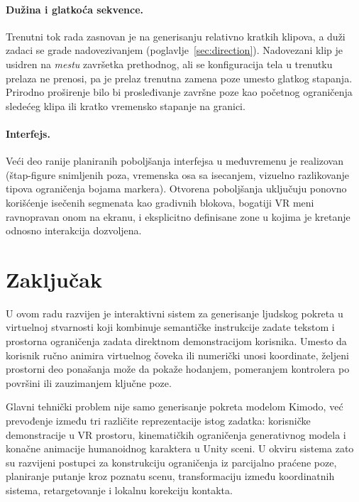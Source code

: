 \documentclass{article}
\begin{document}
\paragraph{Dužina i glatkoća sekvence.}
Trenutni tok rada zasnovan je na generisanju relativno kratkih klipova, a duži zadaci se grade nadovezivanjem (poglavlje~\ref{sec:direction}). Nadovezani klip je usidren na \emph{mestu} završetka prethodnog, ali se konfiguracija tela u trenutku prelaza ne prenosi, pa je prelaz trenutna zamena poze umesto glatkog stapanja. Prirodno proširenje bilo bi prosleđivanje završne poze kao početnog ograničenja sledećeg klipa ili kratko vremensko stapanje na granici.

\paragraph{Interfejs.}
Veći deo ranije planiranih poboljšanja interfejsa u međuvremenu je realizovan (štap-figure snimljenih poza, vremenska osa sa isecanjem, vizuelno razlikovanje tipova ograničenja bojama markera). Otvorena poboljšanja uključuju ponovno korišćenje isečenih segmenata kao gradivnih blokova, bogatiji VR meni ravnopravan onom na ekranu, i eksplicitno definisane zone u kojima je kretanje odnosno interakcija dozvoljena.


\section{Zaključak}
\label{sec:conclusion}

U ovom radu razvijen je interaktivni sistem za generisanje ljudskog pokreta u virtuelnoj stvarnosti koji kombinuje semantičke instrukcije zadate tekstom i prostorna ograničenja zadata direktnom demonstracijom korisnika. Umesto da korisnik ručno animira virtuelnog čoveka ili numerički unosi koordinate, željeni prostorni deo ponašanja može da pokaže hodanjem, pomeranjem kontrolera po površini ili zauzimanjem ključne poze.

Glavni tehnički problem nije samo generisanje pokreta modelom Kimodo, već prevođenje između tri različite reprezentacije istog zadatka: korisničke demonstracije u VR prostoru, kinematičkih ograničenja generativnog modela i konačne animacije humanoidnog karaktera u Unity sceni. U okviru sistema zato su razvijeni postupci za konstrukciju ograničenja iz parcijalno praćene poze, planiranje putanje kroz poznatu scenu, transformaciju između koordinatnih sistema, retargetovanje i lokalnu korekciju kontakta.
\end{document}
